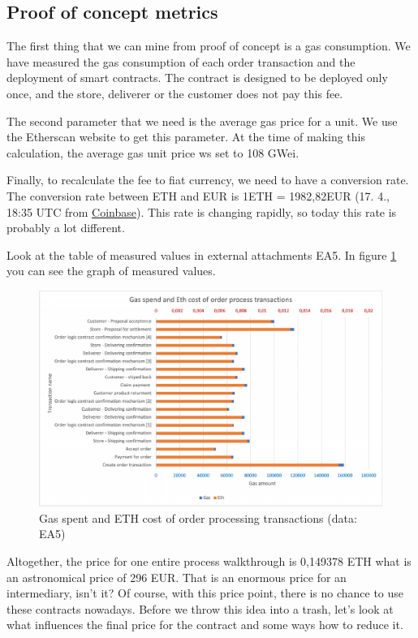 \documentclass[thesis=M,english]{FITthesis}[2019/12/23]
\begin{document}
\subsection{Proof of concept metrics}

The first thing that we can mine from proof of concept is a gas consumption. We have measured the gas consumption of each order transaction and the deployment of smart contracts. The contract is designed to be deployed only once, and the store, deliverer or the customer does not pay this fee.  
 
The second parameter that we need is the average gas price for a unit. We use the Etherscan website to get this parameter. At the time of making this calculation, the average gas unit price ws set to 108 GWei.

Finally, to recalculate the fee to fiat currency, we need to have a conversion rate. The conversion rate between ETH and EUR is 1ETH = 1982,82EUR (17. 4., 18:35 UTC from \href{https://www.coinbase.com}{Coinbase}). This rate is changing rapidly, so today this rate is probably a lot different. 

Look at the table of measured values in external attachments EA5. In figure \ref{fig:gasSpend} you can see the graph of measured values. 


\begin{figure}[ht!]
    \centering
    \includegraphics[width=\textwidth]{assets/PoCMetrics3.pdf}
    \caption{Gas spent and ETH cost of order processing transactions (data: EA5)}
    \label{fig:gasSpend}
\end{figure}


Altogether, the price for one entire process walkthrough is 0,149378 ETH what is an astronomical price of 296 EUR. That is an enormous price for an intermediary, isn't it? Of course, with this price point, there is no chance to use these contracts nowadays. Before we throw this idea into a trash, let's look at what influences the final price for the contract and some ways how to reduce it.
\end{document}
